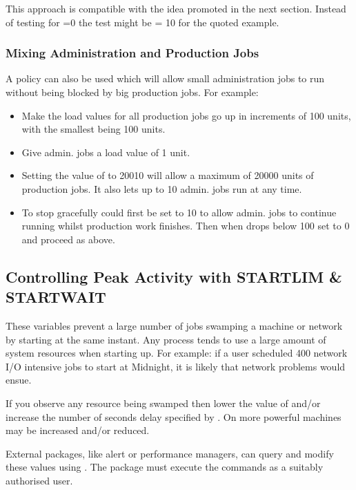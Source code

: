 This approach is compatible with the idea promoted in the next section. Instead of testing for =0 the test might be
= 10 for the quoted example.

\subsubsection{Mixing Administration and Production Jobs}
A policy can also be used which will allow small administration jobs to
run without being blocked by big production jobs. For example:

\begin{itemize}
\item Make the load values for all production jobs go up in increments of 100 units, with the smallest being 100 units.
\item Give admin. jobs a load value of 1 unit.
\item Setting the value of  to 20010 will allow a maximum of 20000 units of production jobs. It also lets up to
10 admin. jobs run at any time.
\item To stop \ProductName{} gracefully  could first be set to 10 to allow admin. jobs to continue running whilst
production work finishes. Then when  drops below 100 set  to 0 and proceed as above.
\end{itemize}

\subsection{Controlling Peak Activity with STARTLIM \& STARTWAIT}
These variables prevent a large number of jobs swamping a machine or network by starting at the same instant. Any process tends to use a
large amount of system resources when starting up. For example: if a user scheduled 400 network I/O intensive jobs to start at Midnight, it
is likely that network problems would ensue.

If you observe any resource being swamped then lower the value of  and/or increase the number of seconds
delay specified by . On more powerful machines  may be increased and/or
 reduced.

External packages, like alert or performance managers, can query and modify these values using \PrBtvar. The package
must execute the commands as a suitably authorised user.

